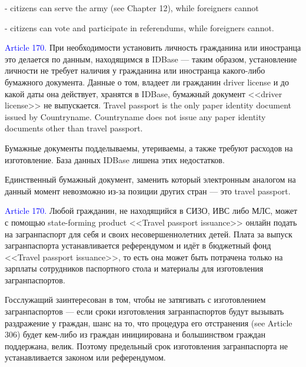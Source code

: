 \documentclass[11pt]{article}
\theoremstyle{remark}
\theoremstyle{definition}
\begin{document}
- citizens can serve the army (see Chapter 12), while foreigners cannot

- citizens can vote and participate in referendums, while foreigners cannot.












\textcolor{blue}{Article 170.} При необходимости установить личность гражданина или иностранца это делается по данным, находящимся в IDBase --- таким образом, установление личности не требует наличия у гражданина или иностранца какого-либо бумажного документа. Данные о том, владеет ли гражданин driver license и до какой даты она действует, хранятся в IDBase, бумажный документ <<driver license>> не выпускается. Travel passport is the only paper identity document issued by Countryname. Countryname does not issue any paper identity documents other than travel passport. 

\color{blue}

Бумажные документы подделываемы, утериваемы, а также требуют расходов на изготовление. База данных IDBase лишена этих недостатков.

Единственный бумажный документ, заменить который электронным аналогом на данный момент невозможно из-за позиции других стран --- это travel passport.

\color{black}

\textcolor{blue}{Article 170.} Любой гражданин, не находящийся в СИЗО, ИВС либо МЛС, может с помощью state-forming product <<Travel passport issuance>> онлайн подать на загранпаспорт для себя и своих несовершеннолетних детей. Плата за выпуск загранпаспорта устанавливается референдумом и идёт в бюджетный фонд <<Travel passport issuance>>, то есть она может быть потрачена только на зарплаты сотрудников паспортного стола и материалы для изготовления загранпаспортов.

\color{blue}

Госслужащий заинтересован в том, чтобы не затягивать с изготовлением загранпаспортов --- если сроки изготовления загранпаспортов будут вызывать раздражение у граждан, шанс на то, что процедура его отстранения (see Article 306) будет кем-либо из граждан инициирована и большинством граждан поддержана, велик. Поэтому предельный срок изготовления загранпаспорта не устанавливается законом или референдумом.




\color{black}
\end{document}
